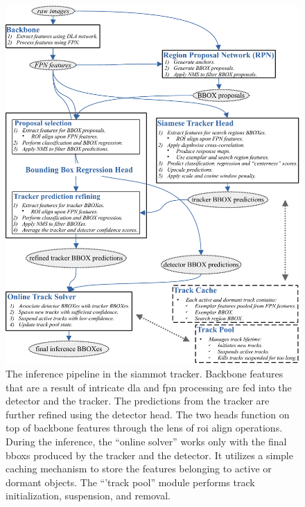 \begin{figure}[H]
    \centering
    \includegraphics[width=\linewidth]{figures/siamese_tracking/siammot_inference_diagram.pdf}
    \caption[\gls{siammot} inference diagram]{The inference pipeline in the \gls{siammot} tracker. Backbone features that are a result of intricate \gls{dla} and \gls{fpn} processing are fed into the detector and the tracker. The predictions from the tracker are further refined using the detector head. The two heads function on top of backbone features through the lens of \gls{roi} align operations. During the inference, the ``online solver'' works only with the final \glspl{bbox} produced by the tracker and the detector. It utilizes a simple caching mechanism to store the features belonging to active or dormant objects. The ``'track pool'' module performs track initialization, suspension, and removal.}
    \label{fig:SiamMOTInference}
\end{figure}

